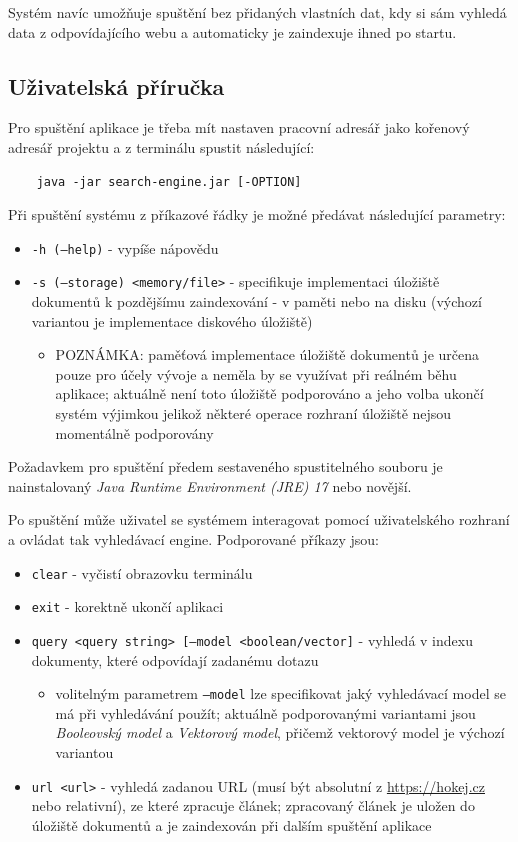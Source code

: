 \documentclass{article}
\begin{document}
Systém navíc umožňuje spuštění bez přidaných vlastních dat, kdy si sám vyhledá data z odpovídajícího webu a automaticky je zaindexuje ihned po startu.

\subsection{Uživatelská příručka}
Pro spuštění aplikace je třeba mít nastaven pracovní adresář jako kořenový adresář projektu a z terminálu spustit následující:

\begin{verbatim}
    java -jar search-engine.jar [-OPTION]
\end{verbatim}

Při spuštění systému z příkazové řádky je možné předávat následující parametry:
\begin{itemize}
    \item \texttt{-h (--help)} - vypíše nápovědu
    \item \texttt{-s (--storage) <memory/file>} - specifikuje implementaci úložiště dokumentů k pozdějšímu zaindexování - v paměti nebo na disku (výchozí variantou je implementace diskového úložiště)
        \begin{itemize}
            \item POZNÁMKA: paměťová implementace úložiště dokumentů je určena pouze pro účely vývoje a neměla by se využívat při reálném běhu aplikace; aktuálně není toto úložiště podporováno a jeho volba ukončí systém výjimkou jelikož některé operace rozhraní úložiště nejsou momentálně podporovány
        \end{itemize}
\end{itemize}

Požadavkem pro spuštění předem sestaveného spustitelného souboru je nainstalovaný \textit{Java Runtime Environment (JRE) 17} nebo novější.

\newpage
Po spuštění může uživatel se systémem interagovat pomocí uživatelského rozhraní a ovládat tak vyhledávací engine. Podporované příkazy jsou:
\begin{itemize}
    \item \texttt{clear} - vyčistí obrazovku terminálu
    \item \texttt{exit} - korektně ukončí aplikaci
    \item \texttt{query <query string> [--model <boolean/vector]} - vyhledá v indexu dokumenty, které odpovídají zadanému dotazu
    \begin{itemize}
        \item volitelným parametrem \texttt{--model} lze specifikovat jaký vyhledávací model se má při vyhledávání použít; aktuálně podporovanými variantami jsou \textit{Booleovský model} a \textit{Vektorový model}, přičemž vektorový model je výchozí variantou
    \end{itemize}
    \item \texttt{url <url>} - vyhledá zadanou URL (musí být absolutní z \url{https://hokej.cz} nebo relativní), ze které zpracuje článek; zpracovaný článek je uložen do úložiště dokumentů a je zaindexován při dalším spuštění aplikace
\end{itemize}
\end{document}
